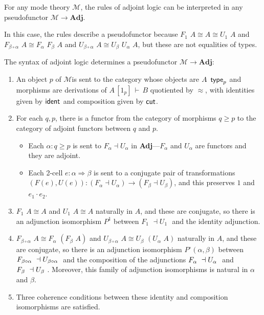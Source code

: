 \documentclass{drl-common/llncs}
\newcommand{\M}{\ensuremath{\mathcal{M}}}
\newcommand{\la}{\ensuremath{\dashv}}
\newcommand{\tc}[2]{\ensuremath{#1 \Rightarrow #2}}
\newcommand{\Adj}{\textbf{Adj}}
\newcommand\compo[2]{\ensuremath{#1 \circ #2}}
\newcommand\compv[2]{\ensuremath{#1 \cdot #2}}
\renewcommand\wftp[2]{\ensuremath{#1 \,\,\, \dsd{type}_{#2}}}
\newcommand\F[2]{\ensuremath{F_{#1} \,\, #2}}
\newcommand\U[2]{\ensuremath{U_{#1} \,\, #2}}
\newcommand\seq[3]{\ensuremath{#1 \, [ #2 ] \, \vdash \, #3}}
\newcommand\ident[1]{\ensuremath{\dsd{ident}_{#1}}}
\newcommand\cutsym{\ensuremath{\dsd{cut}}}
\newcommand\ap[2]{\ensuremath{#1 \approx #2}}
\newcommand\iso{\cong}
\begin{document}
\begin{theorem}[Soundness]
For any mode theory \M, the rules of adjoint logic can be interpreted in
any pseudofunctor $\M \to \Adj$.
\end{theorem}

In this case, the rules describe a pseudofunctor because $\F 1 A \iso A
\iso \U 1 A$ and $\F{\compo{\beta}{\alpha}}{A} \iso
\F{\alpha}{\F{\beta}{A}}$ and $\U{\compo{\beta}{\alpha}}{A} \iso
\U{\beta}{\U{\alpha}{A}}$, but these are not equalities of types.  

\begin{theorem}[Completeness] \label{thm:syntacticpseudofunctor}
The syntax of adjoint logic determines a pseudofunctor $\M \to \Adj$:
\begin{enumerate}
\item An object $p$ of \M is sent to the category whose objects are
  \wftp{A}{p} and morphisms are derivations of
  \seq{A}{1_p}{B} quotiented by $\ap{}{}$, with identities given by
  \ident{} and composition given by \cutsym.

\item For each $q,p$, there is a functor from the category of morphisms
  $q \ge p$ to the category of adjoint functors between $q$ and $p$.
  \begin{itemize}
  \item 
  Each $\alpha : q \ge p$ is sent to $F_\alpha \la U_\alpha$ in
  \Adj---$F_\alpha$ and $U_\alpha$ are functors and they are adjoint.

  \item Each 2-cell $e : \tc{\alpha}{\beta}$ is sent to a conjugate pair of transformations
     $(F(e),U(e)) : (F_\alpha \la U_\alpha) \to (F_\beta \la
    U_\beta)$, and this preserves $1$ and $\compv{e_1}{e_2}$.
  \end{itemize}

\item $\F 1 A \iso A$ and $\U 1 A \iso A$ naturally in $A$, and these
  are conjugate, so there is an adjunction isomorphism $P^1$ between $\F 1 {}
  \la \U 1 {}$ and the identity adjunction.

\item $\F {\compo{\beta}{\alpha}} A \iso \F \alpha {(\F \beta A)}$ and
  $\U {\compo{\beta}{\alpha}} A \iso \U \beta {(\U \alpha A)}$ naturally
  in $A$, and these are conjugate, so there is an adjunction isomorphism
  $P^{\circ}(\alpha,\beta)$ between $\F {\compo{\beta}{\alpha}} \la \U
  {\compo{\beta}{\alpha}}$ and the composition of the adjunctions $\F
  {\alpha} \la \U {\alpha}$ and $\F {\beta} \la \U {\beta}$.  Moreover,
  this family of adjunction isomorphisms is natural in $\alpha$ and
  $\beta$.

\item Three coherence conditions between these identity and composition
  isomorphisms are satisfied.
\end{enumerate}
\end{theorem}
\end{document}
